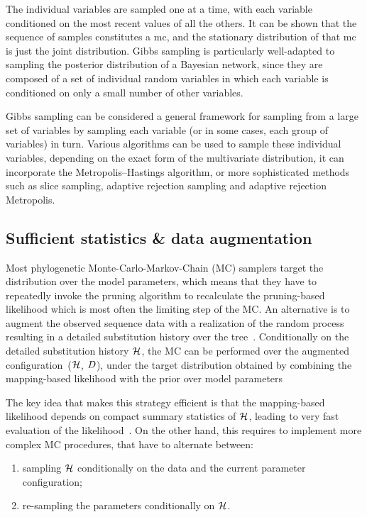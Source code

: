 The individual variables are sampled one at a time, with each variable conditioned on the most recent values of all the others.
It can be shown that the sequence of samples constitutes a \gls{mc}, and the stationary distribution of that \gls{mc} is just the joint distribution.
Gibbs sampling is particularly well-adapted to sampling the \gls{posterior} distribution of a Bayesian network, since they are composed of a set of individual random variables in which each variable is conditioned on only a small number of other variables.

Gibbs sampling can be considered a general framework for sampling from a large set of variables by sampling each variable (or in some cases, each group of variables) in turn.
Various algorithms can be used to sample these individual variables, depending on the exact form of the multivariate distribution, it can incorporate the Metropolis–Hastings algorithm, or more sophisticated methods such as slice sampling, adaptive rejection sampling and adaptive rejection Metropolis.

\subsection{Sufficient statistics \& data augmentation}

Most phylogenetic Monte-Carlo-Markov-Chain (\acrshort{MC}) samplers target the distribution over the model parameters, which means that they have to repeatedly invoke the pruning algorithm to recalculate the pruning-based \gls{likelihood} which is most often the limiting step of the \acrshort{MC}.
An alternative is to augment the observed sequence data with a realization of the random process resulting in a detailed \gls{substitution} history over the tree~\citep{Nielsen2002,Rodrigue2008}.
Conditionally on the detailed \gls{substitution} history $\mathcal{H}$, the \acrshort{MC} can be performed over the augmented configuration~($\mathcal{H}$, $D$), under the target distribution obtained by combining the mapping-based \gls{likelihood} with the \gls{prior} over model parameters

The key idea that makes this strategy efficient is that the mapping-based \gls{likelihood} depends on compact summary statistics of $\mathcal{H}$, leading to very fast evaluation of the \gls{likelihood}~\citep{Irvahn2014,Davydov2016}.
On the other hand, this requires to implement more complex \acrshort{MC} procedures, that have to alternate between:
\begin{enumerate}
    \item sampling $\mathcal{H}$ conditionally on the data and the current parameter configuration;
    \item re-sampling the parameters conditionally on $\mathcal{H}$.
\end{enumerate}

